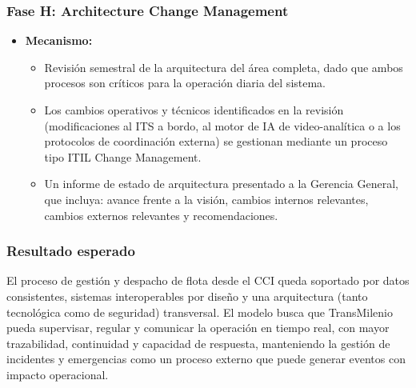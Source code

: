\begin{singlespace}
\subsubsection*{Fase H: Architecture Change Management}

\begin{itemize}
	\item \textbf{Mecanismo:}
	\begin{itemize}
		\item[$\Rightarrow$] Revisión semestral de la arquitectura del área completa, dado que ambos procesos son críticos para la operación diaria del sistema.
		\item[$\Rightarrow$] Los cambios operativos y técnicos identificados en la revisión (modificaciones al ITS a bordo, al motor de IA de video-analítica o a los protocolos de coordinación externa) se gestionan mediante un proceso tipo ITIL Change Management.
		\item[$\Rightarrow$] Un informe de estado de arquitectura presentado a la Gerencia General, que incluya: avance frente a la visión, cambios internos relevantes, cambios externos relevantes y recomendaciones.
	\end{itemize}
\end{itemize}

\subsubsection*{Resultado esperado}

El proceso de gestión y despacho de flota desde el CCI queda soportado por datos consistentes, sistemas interoperables por diseño y una arquitectura (tanto tecnológica como de seguridad) transversal. El modelo busca que TransMilenio pueda supervisar, regular y comunicar la operación en tiempo real, con mayor trazabilidad, continuidad y capacidad de respuesta, manteniendo la gestión de incidentes y emergencias como un proceso externo que puede generar eventos con impacto operacional.

\end{singlespace}
